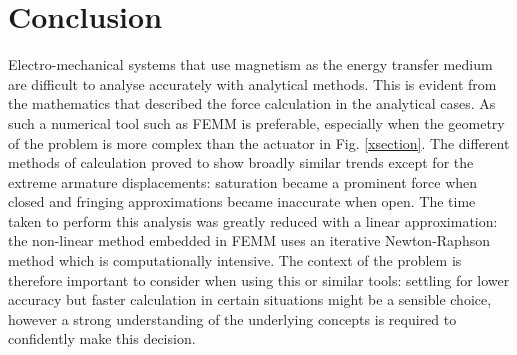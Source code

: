 \documentclass[a4paper]{IEEEtran}
\begin{document}
\section{Conclusion}
Electro-mechanical systems that use magnetism as the energy transfer medium are difficult to analyse accurately with analytical methods. This is evident from the mathematics that described the force calculation in the analytical cases. As such a numerical tool such as FEMM is preferable, especially when the geometry of the problem is more complex than the actuator in Fig. \ref{xsection}. The different methods of calculation proved to show broadly similar trends except for the extreme armature displacements: saturation became a prominent force when closed and fringing approximations became inaccurate when open. The time taken to perform this analysis was greatly reduced with a linear approximation: the non-linear method embedded in FEMM uses an iterative Newton-Raphson method which is computationally intensive. The context of the problem is therefore important to consider when using this or similar tools: settling for lower accuracy but faster calculation in certain situations might be a sensible choice, however a strong understanding of the underlying concepts is required to confidently make this decision.


\printbibliography

% 

% 
 
% 
\end{document}
